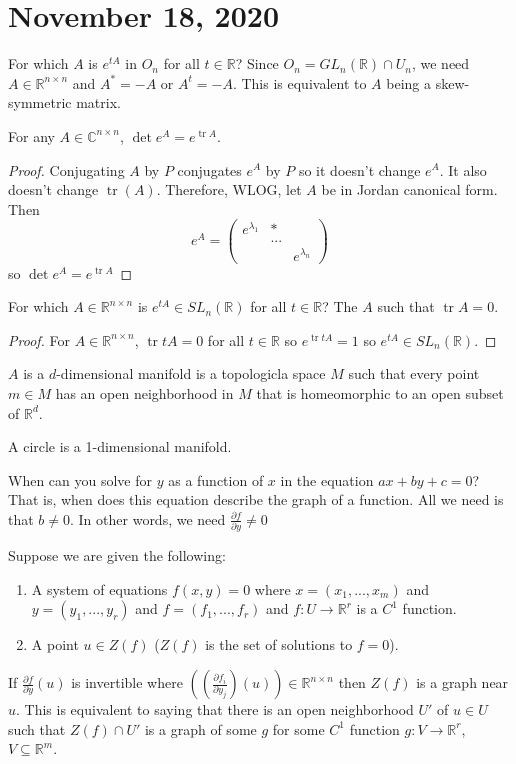 \documentclass{article}
\newcommand{\C}{\mathbb{C}}
\newcommand{\R}{\mathbb{R}}
\newcommand{\ra}[1][]{\xrightarrow{#1}}
\DeclareMathOperator{\tr}{tr}
\begin{document}
\section{November 18, 2020}
For which $A$ is $e^{tA}$ in $O_n$ for all $t\in \R$? 
Since $O_n=GL_n(\R)\cap U_n$, we need $A\in \R^{n\times n}$ and $A^*=-A$ or $A^t=-A$. This is equivalent to $A$ being a skew-symmetric matrix.
\begin{lemma}
For any $A\in \C^{n\times n}$, $\det e^A=e^{\tr A}$.
\end{lemma}
\begin{proof}
Conjugating $A$ by $P$ conjugates $e^A$ by $P$ so it doesn't change $e^A$. It also doesn't change $\tr(A)$. Therefore, WLOG, let $A$ be in Jordan canonical form. 
Then 
$$e^A=\begin{pmatrix}
e^{\lambda_1}&*&\\&...&\\&&e^{\lambda_n}
\end{pmatrix}
$$ so $\det e^A=e^{\tr A}$
\end{proof}
For which $A\in\R^{n\times n}$ is $e^{tA}\in SL_n(\R)$ for all $t\in \R$? The $A$ such that $\tr A=0$. 
\begin{proof}
For $A\in \R^{n\times n}$, $\tr tA=0$ for all $t\in \R$ so $e^{\tr tA}=1$ so $e^{tA}\in SL_n(\R)$.
\end{proof}
\begin{definition}
$A$ is a $d$-dimensional manifold is a topologicla space $M$ such that every point $m\in M$ has an open neighborhood in $M$ that is homeomorphic to an open subset of $\R^d$. 
\end{definition}
\begin{example}
A circle is a 1-dimensional manifold. 
\end{example}
When can you solve for $y$ as a function of $x$ in the equation $ax+by+c=0$? That is, when does this equation describe the graph of a function. All we need is that $b\neq 0$. In other words, we need $\frac{\partial f}{\partial y}\neq 0$
\begin{theorem}
Suppose we are given the following:
\begin{enumerate}
    \item A system of equations $f(x,y)=0$ where $x=(x_1,...,x_m)$ and $y=(y_1,...,y_r)$ and $f=(f_1,...,f_r)$ and $f:U\ra \R^r$ is a $C^1$ function.
    \item A point $u\in Z(f)$ ($Z(f)$ is the set of solutions to $f=0$).
\end{enumerate} 
If $\frac{\partial f}{\partial y}(u)$ is invertible where $((\frac{\partial f_i}{\partial y_j})(u))\in \R^{n\times n}$ then $Z(f)$ is a graph near $u$. This is equivalent to saying that there is an open neighborhood $U'$ of $u\in U$ such that $Z(f)\cap U'$ is a graph of some $g$ for some $C^1$ function $g:V\ra\R^r$, $V\subseteq\R^m$.
\end{theorem}
\end{document}
